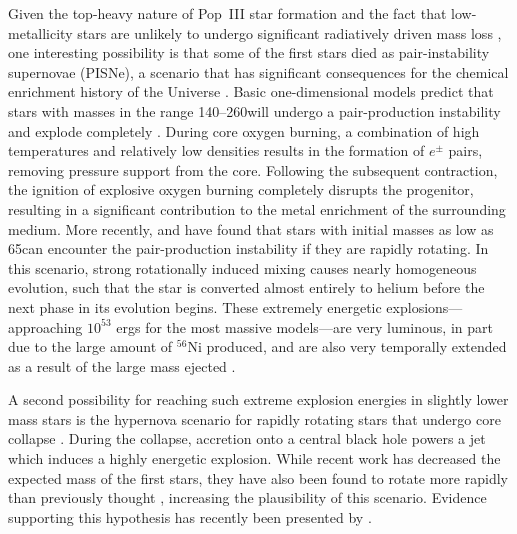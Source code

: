 \documentclass[../thesis.tex]{subfiles}
\begin{document}
Given the top-heavy nature of Pop~III star formation and the fact that
low-metallicity stars are unlikely to undergo significant radiatively
driven mass loss \citep{Kudritzki2002}, one interesting possibility is
that some of the first stars died as pair-instability supernovae
(PISNe), a scenario that has significant consequences for the chemical
enrichment history of the Universe \citep{HegerWoosley2002,
  TumlinsonVenkatesanShull2004, KarlssonJohnsonBromm2008}.  Basic
one-dimensional models predict that stars with masses in the range
140--260\msun will undergo a pair-production instability and explode
completely \citep{BarkatRakavySack1967, Fraley1968}.  During core
oxygen burning, a combination of high temperatures and relatively low
densities results in the formation of $e^{\pm}$ pairs, removing
pressure support from the core. Following the subsequent contraction,
the ignition of explosive oxygen burning completely disrupts the
progenitor, resulting in a significant contribution to the metal
enrichment of the surrounding medium. More recently,
\citet{ChatzopoulosWheeler2012} and \citet{YoonDierksLanger2012} have
found that stars with initial masses as low as 65\msun can encounter
the pair-production instability if they are rapidly rotating.  In this
scenario, strong rotationally induced mixing causes nearly homogeneous
evolution, such that the star is converted almost entirely to helium
before the next phase in its evolution begins.  These extremely
energetic explosions---approaching $10^{53}$ ergs for the most massive
models---are very luminous, in part due to the large amount of $^{56}$Ni
produced, and are also very temporally extended as a result of the
large mass ejected \citep{FryerWoosleyHeger2001, HegerWoosley2002,
  Hegeretal2003, JoggerstWhalen2011, KasenWoosleyHeger2011}.

A second possibility for reaching such extreme explosion energies in
slightly lower mass stars is the hypernova scenario for rapidly
rotating stars that undergo core collapse \citep{UmedaNomoto2003,
  TominagaUmedaNomoto2007}.  During the collapse, accretion onto a
central black hole powers a jet which induces a highly energetic
explosion. While recent work has decreased the expected mass of the
first stars, they have also been found to rotate more rapidly than
previously thought \citep{StacyBrommLoeb2011b}, increasing the
plausibility of this scenario. Evidence supporting this hypothesis has
recently been presented by \citet{Chiappinietal2011}.
\end{document}
